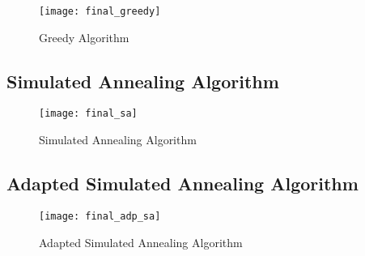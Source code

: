 \documentclass{article}
\begin{document}
\begin{figure}[h]
\begin{center}
\texttt{[image: final\_greedy]} %
\caption{Greedy Algorithm}
\end{center}
\end{figure}

\newpage
\subsection{Simulated Annealing Algorithm}

\begin{figure}[h]
\begin{center}
\texttt{[image: final\_sa]} %
\caption{Simulated Annealing Algorithm}
\end{center}
\end{figure}



\newpage
\subsection{Adapted Simulated Annealing Algorithm}

\begin{figure}[h]
\begin{center}
\texttt{[image: final\_adp\_sa]} %
\caption{Adapted Simulated Annealing Algorithm}
\end{center}
\end{figure}








\end{document}
